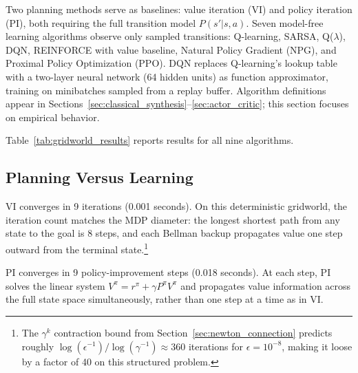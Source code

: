 Two planning methods serve as baselines: value iteration (VI) and policy iteration (PI), both requiring the full transition model $P(s'|s,a)$. Seven model-free learning algorithms observe only sampled transitions: Q-learning, SARSA, Q($\lambda$), DQN, REINFORCE with value baseline, Natural Policy Gradient (NPG), and Proximal Policy Optimization (PPO). DQN replaces Q-learning's lookup table with a two-layer neural network (64 hidden units) as function approximator, training on minibatches sampled from a replay buffer. Algorithm definitions appear in Sections~\ref{sec:classical_synthesis}--\ref{sec:actor_critic}; this section focuses on empirical behavior.

Table~\ref{tab:gridworld_results} reports results for all nine algorithms.

\begin{table}[ht]
\centering
\caption{Performance of nine algorithms on the $5 \times 5$ gridworld. ``Ep to $V^*$ conv'' is the first checkpoint at which $\max_s |V(s) - V^*(s)| < 0.1$ across all 25 states; ``---'' indicates the algorithm never reaches this threshold. All seven learning algorithms achieve the optimal return of 9.30, but only Q-learning, Q($\lambda$), and DQN converge to $V^*$ everywhere.}
\label{tab:gridworld_results}
\footnotesize
\setlength{\tabcolsep}{4pt}

\end{table}

\subsection{Planning Versus Learning}
\label{sec:illustrated_planning}

VI converges in 9 iterations (0.001 seconds). On this deterministic gridworld, the iteration count matches the MDP diameter: the longest shortest path from any state to the goal is 8 steps, and each Bellman backup propagates value one step outward from the terminal state.\footnote{The $\gamma^k$ contraction bound from Section~\ref{sec:newton_connection} predicts roughly $\log(\epsilon^{-1}) / \log(\gamma^{-1}) \approx 360$ iterations for $\epsilon = 10^{-8}$, making it loose by a factor of 40 on this structured problem.}

PI converges in 9 policy-improvement steps (0.018 seconds). At each step, PI solves the linear system $V^\pi = r^\pi + \gamma P^\pi V^\pi$ and propagates value information across the full state space simultaneously, rather than one step at a time as in VI.

